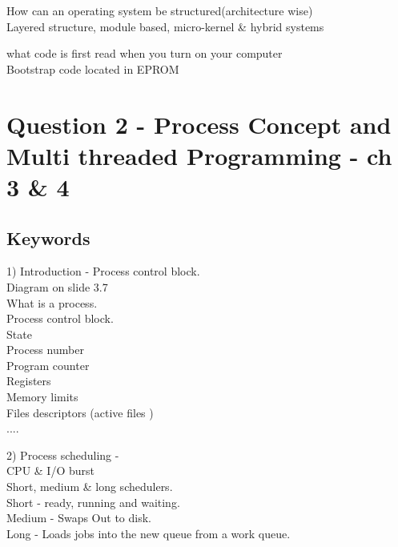 \documentclass[a4paper,10pt,titlepage]{report}
\begin{document}
How can an operating system be structured(architecture wise)\\
\hspace{10mm} Layered structure, module based, micro-kernel \& hybrid systems\\ \vspace{5mm} 


what code is first read when you turn on your computer\\
\hspace{10mm}Bootstrap code located in EPROM \\ \vspace{5mm}





\newpage
\section{Question 2 - Process Concept and Multi threaded Programming - ch 3 \& 4}
\subsection{Keywords}
1) Introduction - Process control block. \\ Diagram on slide 3.7\\
\hspace{10mm}	What is a process. \\
\hspace{10mm}	Process control block. \\
\hspace{15mm}	State \\
\hspace{15mm}	Process number \\
\hspace{15mm}	Program counter \\
\hspace{15mm} 	Registers \\
\hspace{15mm}	Memory limits \\
\hspace{15mm} 	Files descriptors (active files ) \\
\hspace{15mm} 	.... \\
\vspace{5mm}


2) Process scheduling - \\
\hspace{10mm}	CPU \& I/O burst \\
\hspace{10mm}	Short, medium \& long schedulers.\\
\hspace{15mm}   Short - ready, running and waiting. \\
\hspace{15mm}	Medium - Swaps Out to disk. \\
\hspace{15mm}	Long - Loads jobs into the new queue from a work queue. \\
\vspace{5mm}
\end{document}
